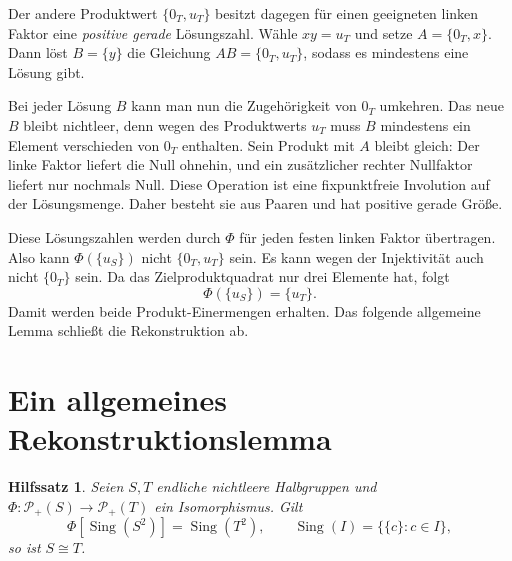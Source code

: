 \documentclass[a4paper,11pt]{article}
\newcommand{\Pp}[1]{\mathcal P_+(#1)}
\newcommand{\Sing}{\operatorname{Sing}}
\newtheorem{lemma}{Hilfssatz}
\begin{document}
Der andere Produktwert \(\{0_T,u_T\}\) besitzt dagegen für einen
geeigneten linken Faktor eine \emph{positive gerade} Lösungszahl.
Wähle \(xy=u_T\) und setze \(A=\{0_T,x\}\). Dann löst
\(B=\{y\}\) die Gleichung \(AB=\{0_T,u_T\}\), sodass es
mindestens eine Lösung gibt.

Bei jeder Lösung \(B\) kann man nun die Zugehörigkeit von \(0_T\)
umkehren. Das neue \(B\) bleibt nichtleer, denn wegen des Produktwerts
\(u_T\) muss \(B\) mindestens ein Element verschieden von \(0_T\)
enthalten. Sein Produkt mit \(A\) bleibt gleich: Der linke Faktor
liefert die Null ohnehin, und ein zusätzlicher rechter Nullfaktor
liefert nur nochmals Null. Diese Operation ist eine fixpunktfreie
Involution auf der Lösungsmenge. Daher besteht sie aus Paaren und hat
positive gerade Größe.

Diese Lösungszahlen werden durch \(\Phi\) für jeden festen linken
Faktor übertragen. Also kann \(\Phi(\{u_S\})\) nicht
\(\{0_T,u_T\}\) sein. Es kann wegen der Injektivität auch nicht
\(\{0_T\}\) sein. Da das Zielproduktquadrat nur drei Elemente hat,
folgt
\[
 \Phi(\{u_S\})=\{u_T\}.
\]
Damit werden beide Produkt-Einermengen erhalten. Das folgende allgemeine
Lemma schließt die Rekonstruktion ab.

\section{Ein allgemeines Rekonstruktionslemma}

\begin{lemma}\label{tw:singleton-lemma}
Seien \(S,T\) endliche nichtleere Halbgruppen und
\(\Phi:\Pp S\to\Pp T\) ein Isomorphismus. Gilt
\[
 \Phi[\Sing(S^2)]=\Sing(T^2),\qquad
 \Sing(I)=\{\{c\}:c\in I\},
\]
so ist \(S\cong T\).
\end{lemma}
\end{document}
